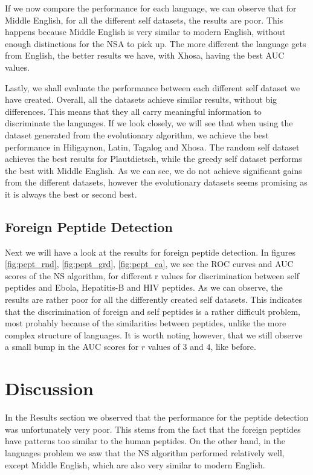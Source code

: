 \documentclass{article}
\begin{document}
If we now compare the performance for each language, we can observe that for Middle English, for all the different self 
datasets, the results are poor. This happens because Middle English is very similar to modern English, without enough 
distinctions for the NSA to pick up. The more different the language gets from English, the better results we have, 
with Xhosa, having the best AUC values.

Lastly, we shall evaluate the performance between each different self dataset we have created. Overall, all the datasets 
achieve similar results, without big differences. This means that they all carry meaningful information to 
discriminate the languages. If we look closely, we will see that when using the dataset generated from the evolutionary 
algorithm, we achieve the best performance in Hiligaynon, Latin, Tagalog and Xhosa. The random self dataset achieves the 
best results for Plautdietsch, while the greedy self dataset performs the best with Middle English. As we can see, we 
do not achieve significant gains from the different datasets, however the evolutionary datasets seems promising as it is 
always the best or second best.

\subsection{Foreign Peptide Detection}


Next we will have a look at the results for foreign peptide detection. In figures \ref{fig:pept_rnd}, \ref{fig:pept_grd}, 
\ref{fig:pept_ea},  we see the ROC curves and AUC scores of the NS algorithm, for different r values for discrimination 
between self peptides and Ebola, Hepatitis-B and HIV peptides. As we can observe, the results are rather poor for all 
the differently created self datasets. This indicates that the discrimination of foreign and self peptides is a rather 
difficult problem, most probably because of the similarities between peptides, unlike the more complex structure of 
languages. It is worth noting however, that we still observe a small bump in the AUC scores for $r$ values of $3$ and 
$4$, like before.

\section{Discussion}
In the Results section we observed that the performance for the peptide detection was unfortunately very poor. This stems
from the fact that the foreign peptides have patterns too similar to the human peptides. On the other hand, in the 
languages problem we saw that the NS algorithm performed relatively well, except Middle English, which are also very 
similar to modern English. 
\end{document}
